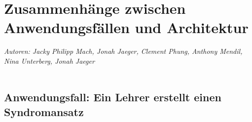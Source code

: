 \documentclass[enabledeprecatedfontcommands,fontsize=11pt,paper=a4,twoside]{scrartcl}
\begin{document}
\newpage
\section[Zusammenhänge zwischen Anwendungsfällen und Architektur]{Zusammenhänge zwischen Anwendungsfällen und Architektur}
\label{sec:anwendungsfaelle}
\emph{Autoren: Jacky Philipp Mach, Jonah Jaeger, Clement Phung, Anthony Mendil, Nina Unterberg, Jonah Jaeger}\\ \\

\subsection{Anwendungsfall: Ein Lehrer erstellt einen Syndromansatz}
\end{document}
